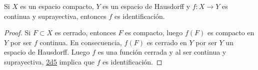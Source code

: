 
\begin{theorem}
Si $X$ es un espacio compacto, $Y$ es un espacio de Hausdorff y $f : X \longrightarrow Y$ es continua y suprayectiva, entonces $f$ es identificación.
\end{theorem}

\begin{proof}
Si $F \subset X$ es cerrado, entonces $F$ es compacto, luego $f(F)$ es compacto en $Y$ por ser $f$ continua. En consecuencia, $f(F)$ es cerrado en $Y$ por ser $Y$ un espacio de Hausdorff. Luego $f$ es una función cerrada y al ser continua y suprayectiva, \hyperref[card:2d5]{\textsf{2d5}} implica que $f$ es identificación.
\end{proof}
